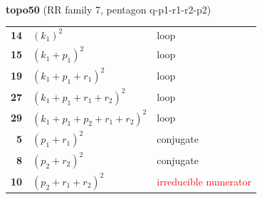 \documentclass[10pt]{article}
\begin{document}
\begin{minipage}[t]{0.48\textwidth}
{}\\[2mm]\textbf{topo50} (RR family 7, pentagon q-p1-r1-r2-p2)\\[2pt]{\footnotesize\begin{tabular}{@{}r@{\ \ }l@{\ \ }l@{}}\textbf{14} & $(k_1)^2$ & loop\\
\textbf{15} & $(k_1+p_1)^2$ & loop\\
\textbf{19} & $(k_1+p_1+r_1)^2$ & loop\\
\textbf{27} & $(k_1+p_1+r_1+r_2)^2$ & loop\\
\textbf{29} & $(k_1+p_1+p_2+r_1+r_2)^2$ & loop\\
\textbf{5} & $(p_1+r_1)^2$ & conjugate\\
\textbf{8} & $(p_2+r_2)^2$ & conjugate\\
\textbf{10} & $(p_2+r_1+r_2)^2$ & \textcolor{red}{irreducible numerator}\\\end{tabular}}\end{minipage}

\bigskip
\end{document}
